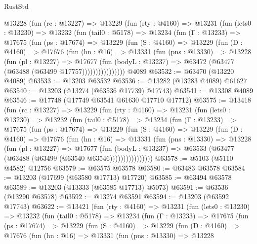 \begin{lexlean}{RustStd}
\begin{coremodule}
    @13228
      (fun (rc : @13227) =>
      @13229
        (fun (rty : @4160) =>
        @13231
          (fun (lets0 : @13230) =>
          @13232
            (fun (tail0 : @5178) =>
            @13234
              (fun (Γ : @13233) =>
              @17675
                (fun (ps : @17674) =>
                @13229
                  (fun (S : @4160) =>
                  @13229
                    (fun (D : @4160) =>
                    @17676
                      (fun (hn : @16) =>
                      @13331
                        (fun (pns : @13330) =>
                        @13228
                          (fun (pl : @13227) =>
                          @17677
                            (fun (bodyL : @13237) =>
                            @63472 (@63477 (@63488 (@63499 @17757))))))))))))))))
    @4089
@63532 := @63470 (@13220 @4089)
@63533 := @13203 @63532
@63536 := @13282 (@13283 @4089) @61627
@63540 := @13203 (@13274 (@63536 @17739) @17743)
@63541 := @13308 @4089
@63546 := @17748 (@17749 @63541 @61630 @17710 @17712)
@63575 := @13418
    (fun (rc : @13227) =>
    @13229
      (fun (rty : @4160) =>
      @13231
        (fun (lets0 : @13230) =>
        @13232
          (fun (tail0 : @5178) =>
          @13234
            (fun (Γ : @13233) =>
            @17675
              (fun (ps : @17674) =>
              @13229
                (fun (S : @4160) =>
                @13229
                  (fun (D : @4160) =>
                  @17676
                    (fun (hn : @16) =>
                    @13331
                      (fun (pns : @13330) =>
                      @13228
                        (fun (pl : @13227) =>
                        @17677
                          (fun (bodyL : @13237) =>
                          @63533 (@63477 (@63488 (@63499 (@63540 @63546))))))))))))))))
@63578 := @5103 (@5110 @4582) @12756
@63579 := @63575 @63578
@63580 := @63483 @63578
@63584 := @13203 (@17699 (@63580 @17713) @17720)
@63585 := @63494 @63578
@63589 := @13203 (@13333 (@63585 @17713) @5073)
@63591 := @63536 (@13290 @63578)
@63592 := @13274 @63591
@63594 := @13203 (@63592 @17743)
@63622 := @13421
    (fun (rty : @4160) =>
    @13231
      (fun (lets0 : @13230) =>
      @13232
        (fun (tail0 : @5178) =>
        @13234
          (fun (Γ : @13233) =>
          @17675
            (fun (ps : @17674) =>
            @13229
              (fun (S : @4160) =>
              @13229
                (fun (D : @4160) =>
                @17676
                  (fun (hn : @16) =>
                  @13331
                    (fun (pns : @13330) =>
                    @13228

\end{coremodule}
\end{lexlean}
